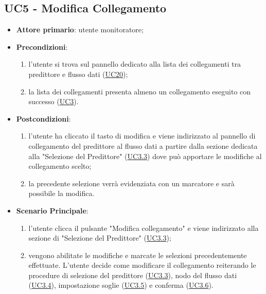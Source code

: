 	\label{par:UC5}
	\subsection{UC5 - Modifica Collegamento}

		\begin{itemize}
			\item\textbf{Attore primario}: utente monitoratore;
			\item\textbf{Precondizioni}: 
				\begin{enumerate}
					\item l'utente si trova sul pannello dedicato alla lista dei collegamenti tra predittore e flusso dati (\hyperref[par:UC20]{UC20});
					\item la lista dei collegamenti presenta almeno un collegamento eseguito con successo (\hyperref[par:UC3]{UC3}).
				\end{enumerate}
			\item\textbf{Postcondizioni}: 
				\begin{enumerate}
					\item l’utente ha cliccato il tasto di modifica e viene indirizzato al pannello di collegamento del predittore al flusso dati a partire dalla sezione dedicata alla "Selezione del Predittore" (\hyperref[par:UC3.3]{UC3.3}) dove può apportare le modifiche al collegamento scelto; 
					\item la precedente selezione verrà evidenziata con un marcatore e sarà possibile la modifica.
				\end{enumerate}
			\item\textbf{Scenario Principale}: 
				\begin{enumerate} 
					\item l'utente clicca il pulsante "Modifica collegamento" e viene indirizzato alla sezione di "Selezione del Predittore" (\hyperref[par:UC3.3]{UC3.3});  
					\item vengono abilitate le modifiche e marcate le selezioni precedentemente effettuate. L'utente decide come modificare il collegamento reiterando le procedure di selezione del predittore (\hyperref[par:UC3.3]{UC3.3}), nodo del flusso dati (\hyperref[par:UC3.4]{UC3.4}), impostazione soglie (\hyperref[par:UC3.5]{UC3.5}) e conferma (\hyperref[par:UC3.6]{UC3.6}). 
				\end{enumerate}		
		\end{itemize}



	\label{par:UC6}

